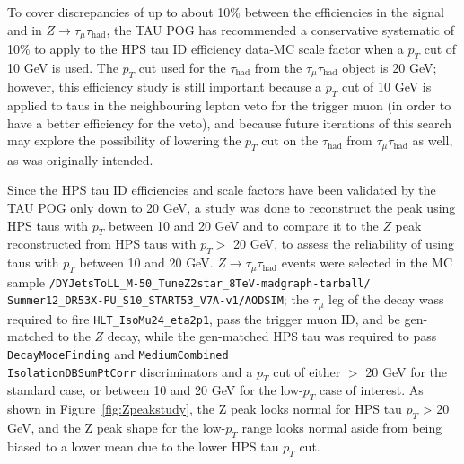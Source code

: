 To cover discrepancies of up to about 10\% between the efficiencies in the signal and in $Z\rightarrow\tau_{\mu}\tau_{\text{had}}$, the TAU POG has recommended a conservative systematic of 10\% to apply to the HPS tau ID efficiency data-MC scale factor when a $p_T$ cut of 10 GeV is used. The $p_T$ cut used for the $\tau_{\text{had}}$ from the $\tau_{\mu}\tau_{\text{had}}$ object is 20 GeV; however, this efficiency study is still important because a $p_T$ cut of 10 GeV is applied to taus in the neighbouring lepton veto for the trigger muon (in order to have a better efficiency for the veto), and because future iterations of this search may explore the possibility of lowering the $p_T$ cut on the $\tau_{\text{had}}$ from $\tau_{\mu}\tau_{\text{had}}$ as well, as was originally intended.

Since the HPS tau ID efficiencies and scale factors have been validated by the TAU POG only down to 20 GeV, a study was done to reconstruct the \Z peak using HPS taus with $p_T$ between 10 and 20 GeV and to compare it to the $Z$ peak reconstructed from HPS taus with $p_T >$ 20 GeV, to assess the reliability of using taus with $p_T$ between 10 and 20 GeV. $Z\rightarrow\tau_{\mu}\tau_{\text{had}}$ events were selected in the MC sample \texttt{/DYJetsToLL\_M-50\_TuneZ2star\_8TeV-madgraph-tarball/\\Summer12\_DR53X-PU\_S10\_START53\_V7A-v1/AODSIM}; the $\tau_{\mu}$ leg of the \Z decay wass required to fire \texttt{HLT\_IsoMu24\_eta2p1}, pass the trigger muon ID, and be gen-matched to the $Z$ decay, while the gen-matched HPS tau was required to pass \texttt{DecayModeFinding} and \texttt{MediumCombined\\IsolationDBSumPtCorr} discriminators and a $p_T$ cut of either $>$ 20 GeV for the standard case, or between 10 and 20 GeV for the low-$p_T$ case of interest. As shown in Figure~\ref{fig:Zpeakstudy}, the Z peak looks normal for HPS tau $p_T$ \textgreater\xspace 20 GeV, and the Z peak shape for the low-$p_T$ range looks normal aside from being biased to a lower mean due to the lower HPS tau $p_T$ cut.

